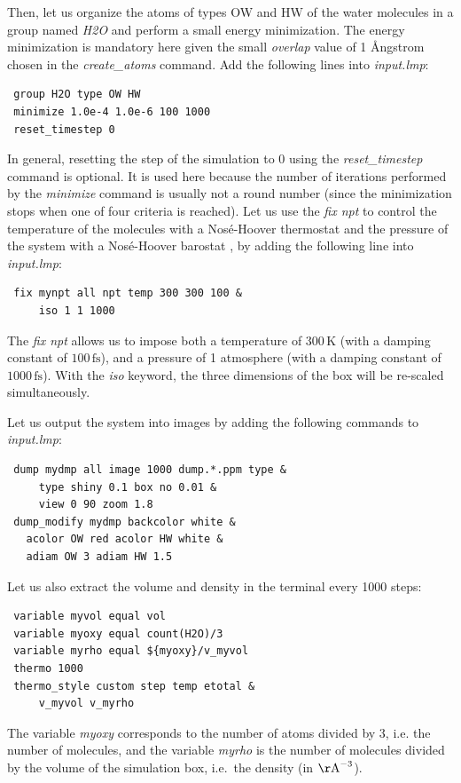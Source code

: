 \documentclass[9pt,tutorial]{livecoms}
\begin{document}
Then, let us organize the atoms of types OW and HW of the water molecules in a
group named \textit{H2O} and perform a small energy minimization. The energy
minimization is mandatory here given the small \textit{overlap} value of 1 Ångstrom
chosen in the \textit{create\_atoms} command. Add the following lines into \textit{input.lmp}:
\begin{lstlisting}
 group H2O type OW HW
 minimize 1.0e-4 1.0e-6 100 1000
 reset_timestep 0
\end{lstlisting}
In general, resetting the step of the simulation to 0 using the
\textit{reset\_timestep} command is optional.
It is used here because the number of iterations performed by the \textit{minimize}
command is usually not a round number (since the minimization stops when one of
four criteria is reached). Let us use the \textit{fix npt} to control the temperature
of the molecules with a Nosé-Hoover thermostat and the pressure of the system with
a Nosé-Hoover barostat \cite{nose1984unified, hoover1985canonical, martyna1994constant},
by adding the following line into \textit{input.lmp}:
\begin{lstlisting}
 fix mynpt all npt temp 300 300 100 &
     iso 1 1 1000
\end{lstlisting}
The \textit{fix npt} allows us to impose both a temperature of $300\,\text{K}$
(with a damping constant of $100\,\text{fs}$), and a pressure of 1 atmosphere
(with a damping constant of $1000\,\text{fs}$). With the \textit{iso} keyword,
the three dimensions of the box will be re-scaled simultaneously.

Let us output the system into images by adding the following commands to \textit{input.lmp}:
\begin{lstlisting}
 dump mydmp all image 1000 dump.*.ppm type &
     type shiny 0.1 box no 0.01 &
     view 0 90 zoom 1.8
 dump_modify mydmp backcolor white &
   acolor OW red acolor HW white &
   adiam OW 3 adiam HW 1.5
\end{lstlisting}
Let us also extract the volume and density in the terminal every 1000 steps:
\begin{lstlisting}
 variable myvol equal vol
 variable myoxy equal count(H2O)/3
 variable myrho equal ${myoxy}/v_myvol
 thermo 1000
 thermo_style custom step temp etotal &
     v_myvol v_myrho
\end{lstlisting}
The variable \textit{myoxy} corresponds to the number of atoms divided by 3, i.e.
the number of molecules, and the variable \textit{myrho} is the number of molecules
divided by the volume of the simulation box, i.e.~the density (in $\mathrm{\AA{}}^{-3}$).
\end{document}

